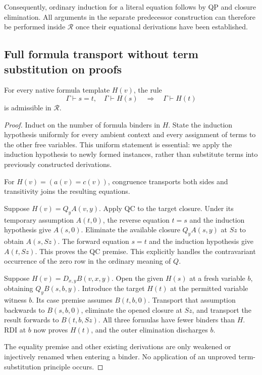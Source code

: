 Consequently, ordinary induction for a literal equation follows by QP
and closure elimination.  All arguments in the separate predecessor
construction can therefore be performed inside $\mathcal R$ once their
equational derivations have been established.

\subsection{Full formula transport without term substitution on proofs}

\begin{lemma}
For every native formula template $H(v)$, the rule
\[
 \Gamma\vdash s=t,\quad\Gamma\vdash H(s)
 \quad\Longrightarrow\quad\Gamma\vdash H(t)
 \tag{L}
\]
is admissible in $\mathcal R$.
\end{lemma}
\begin{proof}
Induct on the number of formula binders in $H$.  State the induction
hypothesis uniformly for every ambient context and every assignment of
terms to the other free variables.  This uniform statement is essential:
we apply the induction hypothesis to newly formed instances, rather than
substitute terms into previously constructed derivations.

For $H(v)=(a(v)=c(v))$, congruence transports both sides and transitivity
joins the resulting equations.

Suppose $H(v)=Q_yA(v,y)$.  Apply QC to the target closure.  Under its
temporary assumption $A(t,0)$, the reverse equation $t=s$ and the
induction hypothesis give $A(s,0)$.  Eliminate the available closure
$Q_yA(s,y)$ at $Sz$ to obtain $A(s,Sz)$.  The forward equation $s=t$ and
the induction hypothesis give $A(t,Sz)$.  This proves the QC premise.
This explicitly handles the contravariant occurrence of the zero row
in the ordinary meaning of $Q$.

Suppose $H(v)=D_{x,y}B(v,x,y)$.  Open the given $H(s)$ at a fresh
variable $b$, obtaining $Q_yB(s,b,y)$.  Introduce the target $H(t)$ at
the permitted variable witness $b$.  Its case premise assumes
$B(t,b,0)$.  Transport that assumption backwards to $B(s,b,0)$,
eliminate the opened closure at $Sz$, and transport the result forwards
to $B(t,b,Sz)$.  All three formulas have fewer binders than $H$.
RDI at $b$ now proves $H(t)$, and the outer elimination discharges $b$.

The equality premise and other existing derivations are only weakened
or injectively renamed when entering a binder.  No application of an
unproved term-substitution principle occurs.
\end{proof}


